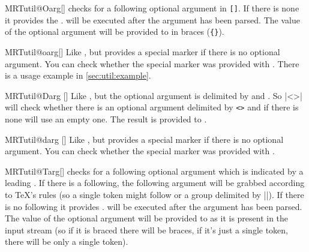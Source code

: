 \begin{describemacro}{MRTutil@Oarg}[]
  checks for a following optional argument in \texttt{[]}. If there is none it
  provides the .  will be executed after the
  argument has been parsed. The value of the optional argument will be provided
  to  in braces (\texttt{\{\}}).
\end{describemacro}

\begin{describemacro}{MRTutil@oarg}[]
  Like , but provides a special marker if there is no optional
  argument. You can check whether the special marker was provided with
  . There is a usage example in \autoref{sec:util:example}.
\end{describemacro}

\begin{describemacro}{MRTutil@Darg}%
  []
  Like , but the optional argument is delimited by
   and . So \bverb|\MRTutil@Darg<>{}\foo| will check
  whether there is an optional argument delimited by \texttt{<>} and if there is
  none will use an empty one. The result is provided to .
\end{describemacro}

\begin{describemacro}{MRTutil@darg}%
  []
  Like , but provides a special marker if there is no optional
  argument. You can check whether the special marker was provided with
  . 
\end{describemacro}

\begin{describemacro}{MRTutil@Targ}[]
  checks for a following optional argument which is indicated by a leading
  . If there is a  following, the following argument
  will be grabbed according to \TeX's rules (so a single token might follow or a
  group delimited by |{}|). If there is no  following it provides
  .  will be executed after the argument has been
  parsed. The value of the optional argument will be provided to 
  as it is present in the input stream (so if it is braced there will be braces,
  if it's just a single token, there will be only a single token).
\end{describemacro}


